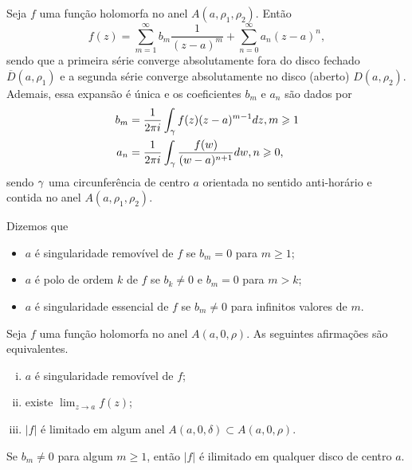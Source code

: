 \begin{teorema}
\label{teo-laurent}
Seja $f$ uma função holomorfa no anel $A(a, \rho_1, \rho_2)$. Então
\begin{equation*}
    f(z) = \sum_{m=1}^{\infty} b_m\frac{1}{(z-a)^m} + \sum_{n=0}^{\infty} a_n(z-a)^n,
\end{equation*}
sendo que a primeira série converge absolutamente fora do disco fechado $\overline{D}(a, \rho_1)$
e a segunda série converge absolutamente no disco (aberto) $D(a, \rho_2)$. 
Ademais, essa expansão é única e os coeficientes $b_m$ e $a_n$ são dados por
\begin{align*}
    b_m &= \frac{1}{2\pi i}\int_{\gamma} f(z)(z-a)^{m-1} dz, m\geqslant 1 \\
    a_n &= \frac{1}{2\pi i}\int_{\gamma} \frac{f(w)}{(w-a)^{n+1}} dw, n\geqslant 0,
\end{align*}
sendo $\gamma$ uma circunferência de centro $a$ orientada no sentido anti-horário 
e contida no anel $A(a, \rho_1, \rho_2)$.
\end{teorema}


\begin{definicao}
Dizemos que 
\begin{itemize}
    \item $a$ é singularidade removível de $f$ se $b_m = 0$ para $m\geq 1$;
    \item $a$ é polo de ordem $k$ de $f$ se $b_k\neq 0$ e $b_m = 0$ para $m>k$;
    \item $a$ é singularidade essencial de $f$ se $b_m\neq 0$ para infinitos valores de $m$.
\end{itemize}
\end{definicao}


\begin{proposicao}
Seja $f$ uma função holomorfa no anel $A(a, 0, \rho)$. As seguintes afirmações são equivalentes.
\begin{enumerate}[(i)]
    \item $a$ é singularidade removível de $f$;
    \item existe $\displaystyle{\lim_{z\to a} f(z)}$;
    \item $|f|$ é limitado em algum anel $A(a, 0, \delta) \subset A(a, 0, \rho)$.
\end{enumerate}
\end{proposicao}


\begin{corolario}
Se $b_m\neq 0$ para algum $m\geq 1$, então $|f|$ é ilimitado em qualquer disco de centro $a$.
\end{corolario}


